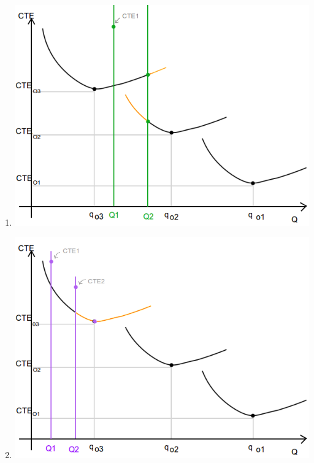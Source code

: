 \documentclass{article}
\begin{document}
\begin{enumerate}
 \item \includegraphics[scale=0.4,keepaspectratio=true]{img/7/7_QvsCTE_4B.png} 
 \item \includegraphics[scale=0.4,keepaspectratio=true]{img/7/7_QvsCTE_5B.png} 
\end{enumerate}
\end{document}
